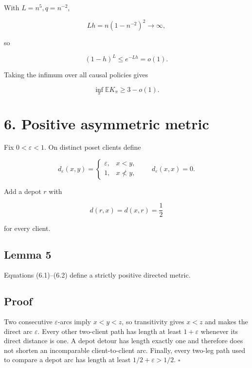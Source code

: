 \documentclass[11pt,a4paper]{article}
\begin{document}
With \(L=n^5,q=n^{-2}\),


\[
 Lh
 =n(1-n^{-2})^2
 \longrightarrow\infty,
\]

so


\[
                         (1-h)^L\le e^{-Lh}=o(1).
\]

Taking the infimum over all causal policies gives


\begin{equation}
                         \inf_\pi\mathbb E K_\pi
                                  \ge3-o(1).
\tag{5.6}
\end{equation}

\section*{6. Positive asymmetric metric}

Fix \(0<\varepsilon<1\).  On distinct poset clients define


\begin{equation}
 d_\varepsilon(x,y)=
 \begin{cases}
  \varepsilon,&x<y,\\
  1,&x\not<y,
 \end{cases}
\qquad d_\varepsilon(x,x)=0.
\tag{6.1}
\end{equation}

Add a depot \(r\) with


\begin{equation}
                         d(r,x)=d(x,r)=\frac12
\tag{6.2}
\end{equation}

for every client.


\subsection*{Lemma 5}

Equations (6.1)--(6.2) define a strictly positive directed metric.


\subsection*{Proof}

Two consecutive \(\varepsilon\)-arcs imply \(x<y<z\), so transitivity gives \(x<z\) and makes the direct arc \(\varepsilon\).  Every other two-client path has length at least \(1+\varepsilon\) whenever its direct distance is one.  A depot detour has length exactly one and therefore does not shorten an incomparable client-to-client arc.  Finally, every two-leg path used to compare a depot arc has length at least \(1/2+\varepsilon>1/2\). \(\square\)
\end{document}
